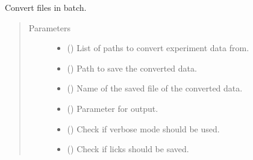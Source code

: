 \documentclass[letterpaper,10pt,english]{sphinxmanual}
\begin{document}
\begin{fulllineitems}
\label{\detokenize{NoSeMazeControl/Analysis:Analysis.Conversion.batch_convert}}
\pysigstartsignatures
{}
\pysigstopsignatures
\sphinxAtStartPar
Convert files in batch.
\begin{quote}\begin{description}
\item[{Parameters}] \leavevmode\begin{itemize}
\item {} 
\sphinxAtStartPar
{} () \textendash{} List of paths to convert experiment data from.

\item {} 
\sphinxAtStartPar
{} () \textendash{} Path to save the converted data.

\item {} 
\sphinxAtStartPar
{} () \textendash{} Name of the saved file of the converted data.

\item {} 
\sphinxAtStartPar
{} () \textendash{} Parameter for output.

\item {} 
\sphinxAtStartPar
{} () \textendash{} Check if verbose mode should be used.

\item {} 
\sphinxAtStartPar
{} () \textendash{} Check if licks should be saved.

\end{itemize}

\end{description}\end{quote}

\end{fulllineitems}
\end{document}
